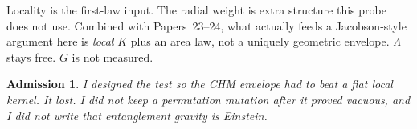 \documentclass[11pt]{article}
\newtheorem*{admission}{Admission}
\begin{document}
Locality is the first-law input. The radial weight is extra
structure this probe does not use. Combined with Papers~23--24,
what actually feeds a Jacobson-style argument here is
\emph{local} $K$ plus an area law, not a uniquely geometric
envelope. $\Lambda$ stays free. $G$ is not measured.

\begin{admission}
I designed the test so the CHM envelope had to beat a flat local
kernel. It lost. I did not keep a permutation mutation after it
proved vacuous, and I did not write that entanglement gravity is
Einstein.
\end{admission}
\end{document}
